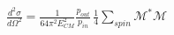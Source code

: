 \begin{align*}
    \frac{d^2\sigma}{d\Omega^2} = 
    \frac{1}{64\pi^2E_{CM}^2}
    \frac{p_{out}}{p_{in}}\,
    \frac{1}{4}\sum_{spin}\mathcal{M}^{*}\mathcal{M}
\end{align*}